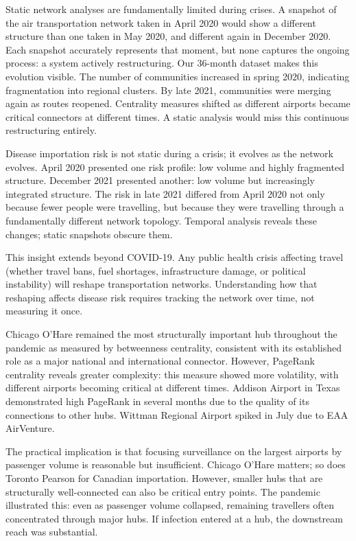 \documentclass{elsarticle}
\begin{document}
Static network analyses are fundamentally limited during crises. A snapshot of the air transportation network taken in April 2020 would show a different structure than one taken in May 2020, and different again in December 2020. Each snapshot accurately represents that moment, but none captures the ongoing process: a system actively restructuring. Our 36-month dataset makes this evolution visible. The number of communities increased in spring 2020, indicating fragmentation into regional clusters. By late 2021, communities were merging again as routes reopened. Centrality measures shifted as different airports became critical connectors at different times. A static analysis would miss this continuous restructuring entirely.

Disease importation risk is not static during a crisis; it evolves as the network evolves. April 2020 presented one risk profile: low volume and highly fragmented structure. December 2021 presented another: low volume but increasingly integrated structure. The risk in late 2021 differed from April 2020 not only because fewer people were travelling, but because they were travelling through a fundamentally different network topology. Temporal analysis reveals these changes; static snapshots obscure them.

This insight extends beyond COVID-19. Any public health crisis affecting travel (whether travel bans, fuel shortages, infrastructure damage, or political instability) will reshape transportation networks. Understanding how that reshaping affects disease risk requires tracking the network over time, not measuring it once.

Chicago O'Hare remained the most structurally important hub throughout the pandemic as measured by betweenness centrality, consistent with its established role as a major national and international connector. However, PageRank centrality reveals greater complexity: this measure showed more volatility, with different airports becoming critical at different times. Addison Airport in Texas demonstrated high PageRank in several months due to the quality of its connections to other hubs. Wittman Regional Airport spiked in July due to EAA AirVenture.

The practical implication is that focusing surveillance on the largest airports by passenger volume is reasonable but insufficient. Chicago O'Hare matters; so does Toronto Pearson for Canadian importation. However, smaller hubs that are structurally well-connected can also be critical entry points. The pandemic illustrated this: even as passenger volume collapsed, remaining travellers often concentrated through major hubs. If infection entered at a hub, the downstream reach was substantial.
\end{document}
